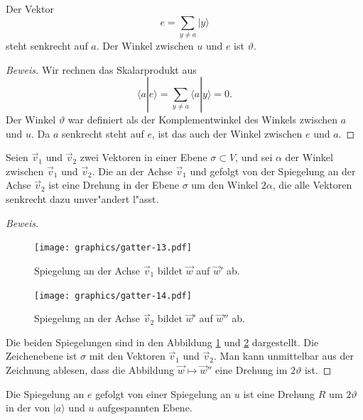 \begin{hilfssatz}
Der Vektor
\[
e=\sum_{y\ne a}|y\rangle
\]
steht senkrecht auf $a$.
Der Winkel zwischen $u$ und $e$ ist $\vartheta$.
\label{skript:hilfssatz-winkel}
\end{hilfssatz}

\begin{proof}[Beweis]
Wir rechnen das Skalarprodukt aus
\[
\langle a|e\rangle
=
\sum_{y\ne a}\langle a|y\rangle =0.
\]
Der Winkel $\vartheta$ war definiert als der Komplementwinkel
des Winkels zwischen $a$ und $u$.
Da $a$ senkrecht steht auf $e$, ist das auch der Winkel zwischen
$e$ und $a$.
\end{proof}

\begin{hilfssatz}
Seien $\vec v_1$ und $\vec v_2$ zwei Vektoren in einer Ebene
$\sigma\subset V$, und sei $\alpha$ der Winkel zwischen $\vec v_1$
und $\vec v_2$.
Die an der Achse $\vec v_1$ und gefolgt von der Spiegelung an der Achse
$\vec v_2$ ist eine Drehung in der Ebene $\sigma$ um den Winkel $2\alpha$,
die alle Vektoren senkrecht dazu unver"andert l"asst.
\label{skript:hilfssatz-drehung}
\end{hilfssatz}

\begin{proof}[Beweis]
\begin{figure}
\centering
\texttt{[image: graphics/gatter-13.pdf]}
\caption{Spiegelung an der Achse $\vec v_1$ bildet $\vec w$ auf $\vec w'$ ab.
\label{skript:drehung-spiegelung-1}}
\end{figure}
\begin{figure}
\centering
\texttt{[image: graphics/gatter-14.pdf]}
\caption{Spiegelung an der Achse $\vec v_2$ bildet $\vec w'$ auf $\vec w''$ ab.
\label{skript:drehung-spiegelung-2}}
\end{figure}
Die beiden Spiegelungen sind in den Abbildung
\ref{skript:drehung-spiegelung-1}
und
\ref{skript:drehung-spiegelung-2}
dargestellt.
Die Zeichenebene ist $\sigma$ mit den Vektoren $\vec v_1$ und $\vec v_2$.
Man kann unmittelbar aus der Zeichnung ablesen, dass
die Abbildung $\vec w\mapsto \vec w''$ eine Drehung im $2\vartheta$ ist.
\end{proof}

\begin{hilfssatz}
Die Spiegelung an $e$ gefolgt von einer Spiegelung an $u$ 
ist eine Drehung $R$ um $2\vartheta$ in der von $|a\rangle$ und $u$
aufgespannten Ebene.
\label{skript:hilfssatz-schritt}
\end{hilfssatz}

